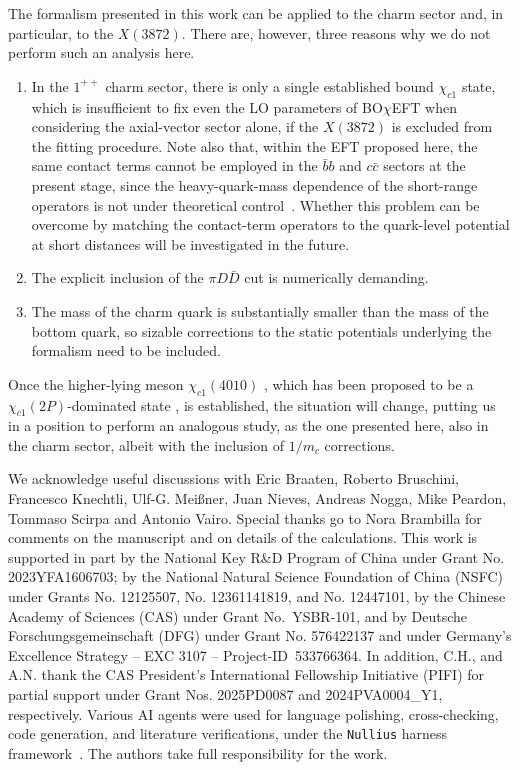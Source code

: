 \documentclass[aps,prd,showpacs,amsmath,twocolumn,superscriptaddress,floatfix,nofootinbib,notitlepage]{revtex4-2}
\newcommand{\X}{X(3872)}
\newcommand{\BOchiEFT}{BO$\chi$EFT\xspace}
\begin{document}
The formalism presented in this work can be applied to the charm sector and, in particular, to the $ \X$. There are, however, three reasons why we do not perform such an analysis here.
\begin{enumerate}
\item In the $1^{++}$ charm sector, there is only a single established bound $\chi_{c1}$ state, which is insufficient to fix even the LO parameters of \BOchiEFT when considering the axial-vector sector alone, if the $\X$ is excluded from the fitting procedure. Note also that, within the EFT proposed here, the same contact terms cannot be employed in the $\bar{b}b$ and $c\bar{c}$ sectors at the present stage, since the heavy-quark-mass dependence of the short-range operators is not under theoretical control~\cite{Baru:2018qkb}. 
Whether this problem can be overcome by matching the contact-term operators to the quark-level potential at short distances will be investigated in the future.
\item The explicit inclusion of the $\pi D\bar{D}$ cut is numerically demanding.
\item The mass of the charm quark is substantially smaller than the mass of the bottom quark, so sizable corrections to the static potentials underlying the formalism need to be included.
\end{enumerate}
Once the higher-lying meson $\chi_{c1}(4010)$ \cite{LHCb:2024vfz}, which has been proposed to be a $\chi_{c1}(2P)$-dominated state \cite{Wang:2023ovj,Li:2024pfg,Shi:2024llv}, is established, the situation will change, putting us in a position to perform an analogous study, as the one presented here, also in the charm sector, albeit with the inclusion of $1/m_c$ corrections.

\acknowledgments
We acknowledge useful discussions with Eric Braaten, Roberto Bruschini, Francesco Knechtli, Ulf-G. Mei\ss ner, Juan Nieves, Andreas Nogga, Mike Peardon, Tommaso Scirpa and Antonio Vairo.
Special thanks go to Nora Brambilla for comments on the manuscript and on 
details of the calculations. 
This work is supported in part by the National Key R\&D Program of China under Grant No. 2023YFA1606703; by the National Natural Science Foundation of China (NSFC) under Grants No. 12125507, No. 12361141819, and No. 12447101, by the Chinese Academy of Sciences (CAS) under Grant No.~YSBR-101, and by
Deutsche Forschungsgemeinschaft (DFG) under Grant No. 576422137
and under Germany's Excellence Strategy -- EXC 3107 -- Project-ID~533766364. In addition, C.H., and A.N. thank the CAS President's International Fellowship Initiative (PIFI) for partial support under Grant Nos. 2025PD0087 and 2024PVA0004\_Y1, respectively.
Various AI agents were used for language polishing, cross-checking, code generation, and literature verifications, under the \texttt{Nullius} harness framework~\cite{nullius}. The authors take full responsibility for the work. 
\end{document}
